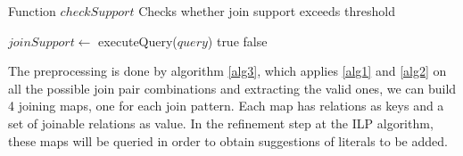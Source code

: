 \begin{algorithm}[h!]
  \caption{Function $checkSupport$ \newline Checks whether join support exceeds threshold}
  \label{alg2}
     {
    }
    $joinSupport \leftarrow$ executeQuery($query$)\;
      {
      \Return true\;
    }{
      \Return false\;
    }
\end{algorithm}


The preprocessing is done by algorithm \ref{alg3}, which applies \ref{alg1} and \ref{alg2} on all the possible join pair
combinations and extracting the valid ones, we can build 4 joining maps, one for each join pattern. Each map has
relations as keys and a set of joinable relations as value. In the refinement step at the ILP algorithm, these maps will
be queried in order to obtain suggestions of literals to be
added.

